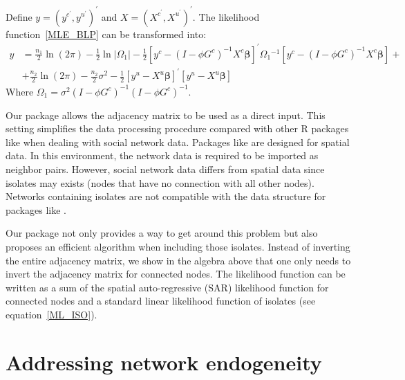 \documentclass[nojss]{jss}
\begin{document}
Define $y=\left( y^{c^{\prime }},y^{u^{\prime }}\right) ^{\prime }$ and $X=\left( X^{c^{\prime }},X^{u^{\prime }}\right) ^{\prime }$. The likelihood function~\ref{MLE_BLP} can be transformed into:
\begin{equation}
\begin{split}
y&=\frac{n_{1}}{2}\ln \left( 2\pi \right) -\frac{1}{2}\ln |\Omega _{1}|-\frac{1}{2}\left[ y^{c}-(I-\phi G^{c})^{-1}X^{c}\mathbf{\beta } \right] ^{\prime}\Omega _{1}{}^{-1}\left[y^{c}-(I-\phi G^{c})^{-1}X^{c} \mathbf{\beta }\right] + \\
&+\frac{n_{2}}{2}\ln \left( 2\pi \right) - \frac{n_{2}}{2}\sigma ^{2}-\frac{1}{2}\left[ y^{u}-X^{u}\mathbf{\beta}\right] ^{\prime }\left[ y^{u}-X^{u}\mathbf{\beta}\right]
\label{ML_ISO}
\end{split}
\end{equation}
Where $\Omega _{1}=\sigma ^{2}(I-\phi G^{c})^{-1}(I-\phi G^{c})^{-1}$.

Our package allows the adjacency matrix to be used as a direct input. This setting simplifies the data processing procedure compared with other R packages like  when dealing with social network data. Packages like  are designed for spatial data. In this environment, the network data is required to be imported as neighbor pairs. However, social network data differs from spatial data since isolates may exists
(nodes that have no connection with all other nodes). Networks containing isolates are not compatible with the data structure for packages like .

Our package not only provides a way to get around this problem but also proposes an efficient algorithm when including those isolates. Instead of inverting the entire adjacency matrix, we show in the algebra above that one only needs to invert the adjacency matrix for connected nodes. The likelihood function can be written as a sum of the spatial auto-regressive (SAR) likelihood function for connected nodes and a standard linear
likelihood function of isolates (see equation~\ref{ML_ISO}).

\section{Addressing network endogeneity} \label{sec:endogeneity}
\end{document}
